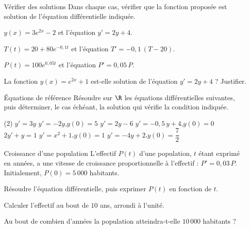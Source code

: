 \exercices
{}

\begin{exercice}[1]{Vérifier des solutions}
Dans chaque cas, vérifier que la fonction proposée est solution de l'équation différentielle indiquée.
\begin{questions}
  \item $y(x)=3e^{2x}-2$ et l'équation $y'=2y+4$.
  \item $T(t)=20+80e^{-0{,}1t}$ et l'équation $T'=-0{,}1\,(T-20)$.
  \item $P(t)=100e^{0{,}05t}$ et l'équation $P'=0{,}05\,P$.
  \item La fonction $y(x)=e^{2x}+1$ est-elle solution de l'équation $y'=2y+4$ ? Justifier.
\end{questions}
\end{exercice}

\begin{exercice}[1]{Équations de référence}
Résoudre sur $\R$ les équations différentielles suivantes, puis déterminer, le cas échéant, la solution qui vérifie la
condition indiquée.
\begin{tasks}(2)
  \task $y'=3y$
  \task $y'=-2y$,\enspace $y(0)=5$
  \task $y'=2y-6$
  \task $y'=-0{,}5\,y+4$,\enspace $y(0)=0$
  \task $2y'+y=1$
  \task $y'=x^{2}+1$,\enspace $y(0)=1$
  \task $y'=-4y+2$,\enspace $y(0)=\dfrac72$
\end{tasks}
\end{exercice}


\begin{exercice}[2]{Croissance d'une population}
L'effectif $P(t)$ d'une population, $t$ étant exprimé en années, a une vitesse de croissance proportionnelle à l'effectif :
$P'=0{,}03\,P$. Initialement, $P(0)=5\,000$ habitants.
\begin{questions}
  \item Résoudre l'équation différentielle, puis exprimer $P(t)$ en fonction de $t$.
  \item Calculer l'effectif au bout de $10$ ans, arrondi à l'unité.
  \item Au bout de combien d'années la population atteindra-t-elle $10\,000$ habitants ?
\end{questions}
\end{exercice}

